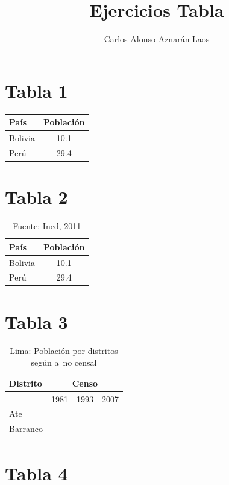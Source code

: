 \documentclass[12pt,a4paper]{article}
\author{Carlos Alonso Aznarán Laos}
\title{Ejercicios Tabla}
\begin{document}
\maketitle

\section{Tabla 1}
\begin{tabular}{|l|c|}
	\hline País    & Población \\
	\hline Bolivia & 10.1      \\
	\hline Perú    & 29.4      \\
	\hline
\end{tabular}

\section{Tabla 2}
\begin{table}[h]
	\centering
	\caption{Población de Bolivia y Perú en 2011 (en millones)}
	\begin{tabular}{lc}
		\hline País    & Población \\
		\hline Bolivia & 10.1      \\
		\hline Perú    & 29.4      \\
		\hline
	\end{tabular}
	\caption*{\scriptsize Fuente: Ined, 2011}
\end{table}

\section{Tabla 3}

\begin{table}[h]
	\centering
	\caption{Lima: Población por distritos según a~no censal}
	\begin{tabular}{|l|c|c|c|}
		\hline \bf Distrito & \multicolumn{3}{c|}{\bf Censo}               \\
		\hline              & 1981                           & 1993 & 2007 \\
		\hline Ate          &                                &      &      \\
		\hline Barranco     &                                &      &      \\
		\hline
	\end{tabular}
\end{table}

\section{Tabla 4}
\end{document}
